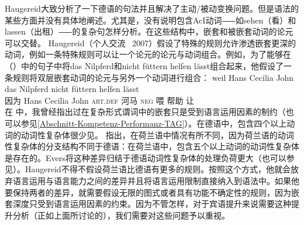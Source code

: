 \begin{exe}
\begin{xlist}[iv.]
\begin{exe}
\begin{xlist}[iv.]
Haugereid大致分析了一下德语的句法并且解决了主动/被动变换问题。但是语法的某些方面并没有具体地阐述。尤其是，没有说明包含AcI动词⸺如sehen（看）和lassen（出租）⸺的复杂句怎样分析。在这些结构中，嵌套和被嵌套动词的论元可以交替。 Haugereid（个人交流 \, 2007）假设了特殊的规则允许渗透嵌套更深的动词，例如一条特殊规则可以让一个论元的论元与动词组合。例如，为了能够在（）中的句子中将das Nilpferd和nicht füttern helfen lässt组合起来，他假设了一条规则将双层嵌套动词的论元与另外一个动词进行组合：
\ea
\label{ex-nilpferd-fuettern-helfen-laesst}
\gll weil    Hans Cecilia John das Nilpferd nicht füttern helfen lässt\\
     因为 Hans Cecilia John \textsc{art}.\textsc{def} 河马 \textsc{neg} 喂 帮助 让\\
\z
在 \citet[]{Mueller2004b}中，我曾经指出过在复杂形式谓词中的嵌套只是受到语言运用因素的制约（也可以参见\ref{Abschnitt-Kompetenz-Performanz-TAG}）。在德语中，包含四个以上动词的动词性复杂体很少见。 \citet[--59]{Evers75a}指出，在荷兰语中情况有所不同，因为荷兰语的动词性复杂体的分支结构不同于德语：在荷兰语中，包含五个以上动词的动词性复杂体是存在的。Evers将这种差异归结于德语动词性复杂体的处理负荷更大（也可以参见\citet[\S~3.7]{Gibson98a}）。Haugereid不得不假设荷兰语比德语有更多的规则。按照这个方式，他就会放弃语言运用与语言能力之间的差异并且将语言运用限制直接纳入到语法中。如果他要保持两者的差异，就需要假设无限的图式或者具有功能不确定性的规则，因为嵌套深度只受到语言运用因素的约束\citep{HN94a}。因为不管怎样，对于宾语提升来说需要这种提升分析（正如上面所讨论的），我们需要对这些问题予以重视。

\end{xlist}
\end{exe}
\end{xlist}
\end{exe}
